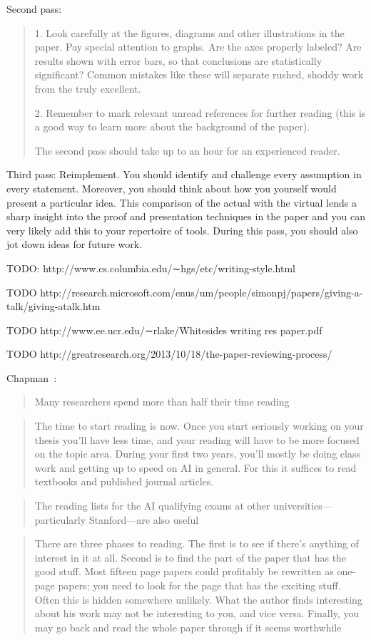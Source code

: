 Second pass:
\blockquote{
1. Look carefully at the figures, diagrams and other illustrations
in the paper. Pay special attention to graphs.
Are the axes properly labeled? Are results shown with
error bars, so that conclusions are statistically significant?
Common mistakes like these will separate
rushed, shoddy work from the truly excellent.

2. Remember to mark relevant unread references for further
reading (this is a good way to learn more about
the background of the paper).

The second pass should take up to an hour for an experienced
reader.}

Third pass: Reimplement. You should
identify and challenge every assumption in every statement.
Moreover, you should think about how you yourself would
present a particular idea. This comparison of the actual
with the virtual lends a sharp insight into the proof and
presentation techniques in the paper and you can very likely
add this to your repertoire of tools. During this pass, you
should also jot down ideas for future work.

TODO: http://www.cs.columbia.edu/∼hgs/etc/writing-style.html

TODO http://research.microsoft.com/enus/um/people/simonpj/papers/giving-a-talk/giving-atalk.htm

TODO http://www.ee.ucr.edu/∼rlake/Whitesides writing res paper.pdf

TODO http://greatresearch.org/2013/10/18/the-paper-reviewing-process/

Chapman~\cite{chapman1988how}:
\blockquote{Many researchers spend more than half their time reading}

\blockquote{The time to start reading is now. Once you start seriously working
on your thesis you’ll have less time, and your reading will have to be more
focused on the topic area. During your first two years, you’ll mostly be doing
class work and getting up to speed on AI in general. For this it suffices to
read textbooks and published journal articles.}

\blockquote{The reading lists for the AI qualifying exams at other
universities—particularly Stanford—are also useful}

\blockquote{There are three phases to reading. The
first is to see if there’s anything of interest in it at all. Second is to find
the part of the paper that has the good stuff. Most fifteen page papers could
profitably be rewritten as one-page papers; you need to look for the page that
has the exciting stuff. Often this is hidden somewhere unlikely. What the author
finds interesting about his work may not be interesting to you, and vice versa.
Finally, you may go back and read the whole paper through if it seems
worthwhile}

